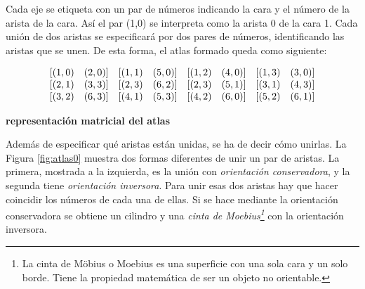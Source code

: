 Cada eje se etiqueta con un par de números indicando la cara y el número de la arista de la cara. Así el par (1,0) se interpreta como la arista 0 de la cara 1. Cada unión de dos aristas se especificará por dos pares de números, identificando las aristas que se unen. De esta forma, el atlas formado queda como siguiente:


$$
\begin{array}{c@{}c@{}c@{}c}
 \begin{array}{cc}
         [(1,0) & (2,0)]
  \end{array} & \begin{array}{cc}
         [(1,1) & (5,0)]
  \end{array} & \begin{array}{cc}
         [(1,2) & (4,0)]
  \end{array} &
  \begin{array}{cc}
         [(1,3) & (3,0)] 
  \end{array}
  \\
  \begin{array}{cc}
         [(2,1) & (3,3)]
  \end{array} & \begin{array}{cc}
         [(2,3) & (6,2)]
  \end{array} & \begin{array}{cc}
         [(2,3) & (5,1)] 
  \end{array} &
  \begin{array}{cc}
         [(3,1) & (4,3)]
  \end{array}
  \\
  \begin{array}{cc}
         [(3,2) & (6,3)]
  \end{array} & \begin{array}{cc}
         [(4,1) & (5,3)]
  \end{array} & \begin{array}{cc}
         [(4,2) & (6,0)] 
  \end{array} &
  \begin{array}{cc}
         [(5,2) & (6,1)] 
  \end{array}
\end{array}
$$   

\begin{center}
\textbf{\footnotesize{representación matricial del atlas}}
\end{center}

Además de especificar qué aristas están unidas, se ha de decir cómo unirlas. La Figura \ref{fig:atlas0} muestra dos formas diferentes de unir un par de aristas. La primera, mostrada a la izquierda, es la unión con \textit{orientación conservadora}, y la segunda tiene \textit{orientación inversora}. Para unir esas dos aristas hay que hacer coincidir los números de cada una de ellas. Si se hace mediante la orientación conservadora se obtiene un cilindro y una \textit{cinta de Moebius\footnote{La cinta de Möbius o Moebius es una superficie con una sola cara y un solo borde. Tiene la propiedad matemática de ser un objeto no orientable.}} con la orientación inversora.

